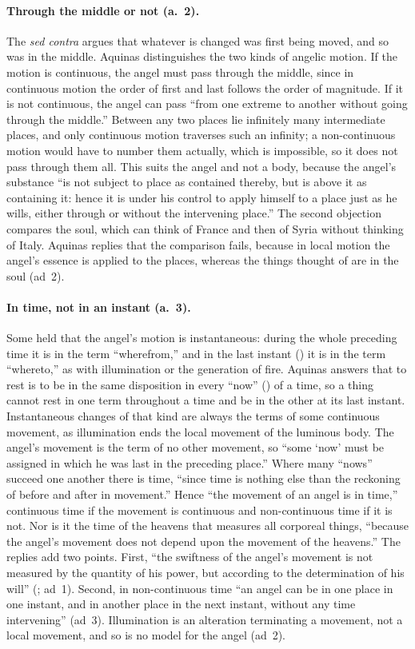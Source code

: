 \paragraph{Through the middle or not (a.~2).} The \emph{sed contra} argues
that whatever is changed was first being moved, and so was in the middle.
Aquinas distinguishes the two kinds of angelic motion. If the motion is
continuous, the angel must pass through the middle, since in continuous
motion the order of first and last follows the order of magnitude. If it
is not continuous, the angel can pass ``from one extreme to another without
going through the middle.'' Between any two places lie infinitely many
intermediate places, and only continuous motion traverses such an
infinity; a non-continuous motion would have to number them actually,
which is impossible, so it does not pass through them all. This suits the
angel and not a body, because the angel's substance ``is not subject to
place as contained thereby, but is above it as containing it: hence it is
under his control to apply himself to a place just as he wills, either
through or without the intervening place.'' The second objection compares
the soul, which can think of France and then of Syria without thinking of
Italy. Aquinas replies that the comparison fails, because in local motion
the angel's essence is applied to the places, whereas the things thought
of are in the soul (ad~2).

\paragraph{In time, not in an instant (a.~3).} Some held that the angel's
motion is instantaneous: during the whole preceding time it is in the term
``wherefrom,'' and in the last instant () it is in the term
``whereto,'' as with illumination or the generation of fire. Aquinas
answers that to rest is to be in the same disposition in every ``now''
() of a time, so a thing cannot rest in one term throughout a
time and be in the other at its last instant. Instantaneous changes of that
kind are always the terms of some continuous movement, as illumination
ends the local movement of the luminous body. The angel's movement is the
term of no other movement, so ``some `now' must be assigned in which he
was last in the preceding place.'' Where many ``nows'' succeed one another
there is time, ``since time is nothing else than the reckoning of before and
after in movement.'' Hence ``the movement of an angel is in time,''
continuous time if the movement is continuous and non-continuous time if
it is not. Nor is it the time of the heavens that measures all corporeal
things, ``because the angel's movement does not depend upon the movement
of the heavens.'' The replies add two points. First, ``the swiftness of the
angel's movement is not measured by the quantity of his power, but
according to the determination of his will'' (; ad~1). Second, in non-continuous time
``an angel can be in one place in one instant, and in another place in the
next instant, without any time intervening'' (ad~3). Illumination is an
alteration terminating a movement, not a local movement, and so is no
model for the angel (ad~2).

